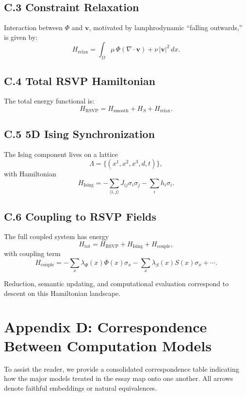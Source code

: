\documentclass[11pt,letterpaper]{article}
\begin{document}
\subsection*{C.3 Constraint Relaxation}
Interaction between $\Phi$ and $\mathbf{v}$, motivated by lamphrodynamic
``falling outwards,'' is given by:
\[
H_{\text{relax}}
=
\int_{\Omega}
\mu\,\Phi(\nabla\cdot\mathbf{v})
+ \nu\,|\mathbf{v}|^2
\,dx.
\]

\subsection*{C.4 Total RSVP Hamiltonian}
The total energy functional is:
\[
H_{\text{RSVP}}
=
H_{\text{smooth}}
+ H_S
+ H_{\text{relax}}.
\]

\subsection*{C.5 5D Ising Synchronization}
The Ising component lives on a lattice
\[
\Lambda = \{(x^1,x^2,x^3,d,t)\},
\]
with Hamiltonian
\[
H_{\text{Ising}}
=
-\sum_{\langle i,j\rangle} J_{ij}\sigma_i\sigma_j
- \sum_i h_i \sigma_i.
\]

\subsection*{C.6 Coupling to RSVP Fields}
The full coupled system has energy
\[
H_{\text{tot}}
=
H_{\text{RSVP}}
+ H_{\text{Ising}}
+ H_{\text{couple}},
\]
with coupling term
\[
H_{\text{couple}}
=
-\sum_{x}\lambda_\Phi(x)\Phi(x)\sigma_x
-\sum_{x}\lambda_S(x)S(x)\sigma_x
+ \cdots.
\]

Reduction, semantic updating, and computational evaluation correspond to
descent on this Hamiltonian landscape.


\section{Appendix D: Correspondence Between Computation Models}

To assist the reader, we provide a consolidated correspondence table indicating
how the major models treated in the essay map onto one another.  
All arrows denote faithful embeddings or natural equivalences.
\end{document}
